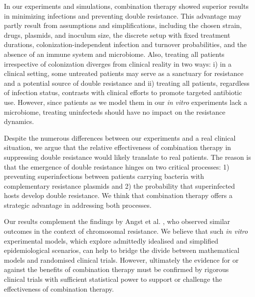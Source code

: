 In our experiments and simulations, combination therapy showed superior results in minimizing infections and preventing double resistance. 
This advantage may partly result from assumptions and simplifications, including the chosen strain, drugs, plasmids, and inoculum size, the discrete setup with fixed treatment durations, colonization-independent infection and turnover probabilities, and the absence of an immune system and microbiome. 
Also, treating all patients irrespective of colonization diverges from clinical reality in two ways: 
i) in a clinical setting, some untreated patients may serve as a sanctuary for resistance and a potential source of double resistance and 
ii) treating all patients, regardless of infection status, contrasts with clinical efforts to promote targeted antibiotic use. 
However, since patients as we model them in our \textit{in vitro} experiments lack a microbiome, treating uninfecteds should have no impact on the resistance dynamics.

Despite the numerous differences between our experiments and a real clinical situation, we argue that the relative effectiveness of combination therapy in suppressing double resistance would likely translate to real patients.
The reason is that the emergence of double resistance hinges on two critical processes: 1) preventing superinfections between patients carrying bacteria with complementary resistance plasmids and 2) the probability that superinfected hosts develop double resistance.
We think that combination therapy offers a strategic advantage in addressing both processes.

Our results complement the findings by Angst et al. \cite{Angst2021}, who observed similar outcomes in the context of chromosomal resistance. We believe that such \textit{in vitro} experimental models, which explore admittedly idealised and simplified epidemiological scenarios, can help to bridge the divide between mathematical models and randomised clinical trials. However, ultimately the evidence for or against the benefits of combination therapy must be confirmed by rigorous clinical trials with sufficient statistical power to support or challenge the effectiveness of combination therapy.


